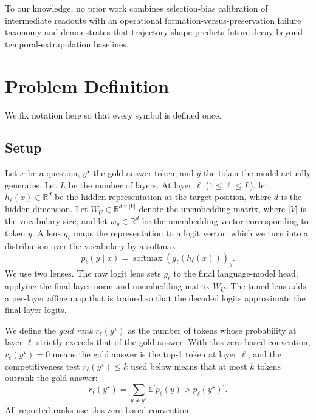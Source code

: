 \documentclass{article} %
\begin{document}
To our knowledge, no prior work combines selection-bias calibration of intermediate readouts with an operational formation-versus-preservation failure taxonomy and demonstrates that trajectory shape predicts future decay beyond temporal-extrapolation baselines.

\section{Problem Definition}
\label{sec:def}

We fix notation here so that every symbol is defined once.

\subsection{Setup}
Let $x$ be a question, $y^\star$ the gold-answer token, and $\hat{y}$ the token the model actually generates. Let $L$ be the number of layers. At layer $\ell$ ($1 \le \ell \le L$), let $h_\ell(x) \in \mathbb{R}^d$ be the hidden representation at the target position, where $d$ is the hidden dimension. Let $W_U \in \mathbb{R}^{d \times |V|}$ denote the unembedding matrix, where $|V|$ is the vocabulary size, and let $w_y \in \mathbb{R}^d$ be the unembedding vector corresponding to token $y$. A lens $g_\ell$ maps the representation to a logit vector, which we turn into a distribution over the vocabulary by a softmax:
\begin{equation}
p_\ell(y \mid x) = \operatorname{softmax}(g_\ell(h_\ell(x)))_y .
\end{equation}
We use two lenses. The raw logit lens \citep{nostalgebraist2020logitlens} sets $g_\ell$ to the final language-model head, applying the final layer norm and unembedding matrix $W_U$. The tuned lens \citep{belrose2023tunedlens} adds a per-layer affine map that is trained so that the decoded logits approximate the final-layer logits.

We define the \emph{gold rank} $r_\ell(y^\star)$ as the number of tokens whose probability at layer $\ell$ strictly exceeds that of the gold answer. With this zero-based convention, $r_\ell(y^\star) = 0$ means the gold answer is the top-1 token at layer $\ell$, and the competitiveness test $r_\ell(y^\star) \le k$ used below means that at most $k$ tokens outrank the gold answer:
\begin{equation}
r_\ell(y^\star) = \sum_{y \neq y^\star} \mathbb{1}\big[ p_\ell(y) > p_\ell(y^\star) \big] .
\end{equation}
All reported ranks use this zero-based convention.
\end{document}
